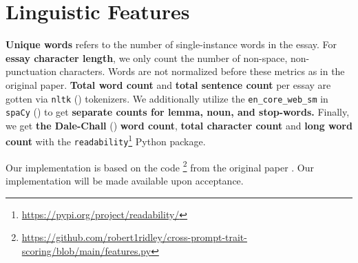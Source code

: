 \section{Linguistic Features}
\label{app:linguistic-features}
\textbf{Unique words} refers to the number of single-instance words in the essay. For \textbf{essay character length}, we only count the number of non-space, non-punctuation characters. Words are not normalized before these metrics as in the original paper. \textbf{Total word count} and \textbf{total sentence count} per essay are gotten via \texttt{nltk} (\cite{loper2002}) tokenizers. We additionally utilize the \texttt{en\_core\_web\_sm} in \texttt{spaCy} (\cite{honnibal2020}) to get \textbf{separate counts for lemma, noun, and stop-words.} Finally, we get \textbf{the Dale-Chall} (\cite{dale1948}) \textbf{word count}, \textbf{total character count} and \textbf{long word count} with the \texttt{readability}\footnote{\url{https://pypi.org/project/readability/}} Python package.

Our implementation is based on the code \footnote{\url{https://github.com/robert1ridley/cross-prompt-trait-scoring/blob/main/features.py}} from the original paper \cite{ridleyAutomatedCrosspromptScoring2021}. Our implementation will be made available upon acceptance.